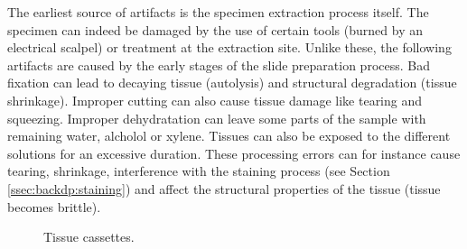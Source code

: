The earliest source of artifacts is the specimen extraction process itself. The specimen can indeed be damaged by the use of certain tools (\eg burned by an electrical scalpel) or treatment at the extraction site. Unlike these, the following artifacts are caused by the early stages of the slide preparation process. Bad fixation can lead to decaying tissue (\ie autolysis) and structural degradation (\eg tissue shrinkage). Improper cutting can also cause tissue damage like tearing and squeezing. Improper dehydratation can leave some parts of the sample with remaining water, alcholol or xylene. Tissues can also be exposed to the different solutions for an excessive duration. These processing errors can for instance cause tearing, shrinkage, interference with the staining process (see Section \ref{ssec:backdp:staining}) and affect the structural properties of the tissue (\eg tissue becomes brittle).


  
    

\begin{figure}
  \centering
  \quad
  \caption{Tissue cassettes.}
\end{figure}

